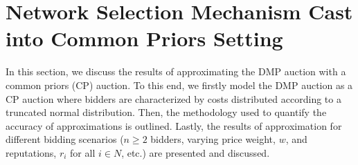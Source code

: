 

\section{Network Selection Mechanism Cast into Common Priors Setting} %
\label{sec:network_selection_mechanism_cast_into_common_priors_setting_approximation}
In this section, we discuss the results of approximating the DMP auction with a common priors (CP) auction. To this end, we firstly model the DMP auction as a CP auction where bidders are characterized by costs distributed according to a truncated normal distribution. Then, the methodology used to quantify the accuracy of approximations is outlined. Lastly, the results of approximation for different bidding scenarios ($n\geq 2$ bidders, varying price weight, $w$, and reputations, $r_i$ for all $i\in N$, etc.) are presented and discussed.

